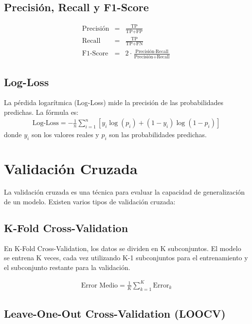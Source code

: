 \documentclass[a4paper]{report} %
\begin{document}
\subsection{Precisión, Recall y F1-Score}

\begin{eqnarray*}
\text{Precisión} &=& \frac{\text{TP}}{\text{TP} + \text{FP}} \\
\text{Recall} &=& \frac{\text{TP}}{\text{TP} + \text{FN}} \\
\text{F1-Score} &=& 2 \cdot \frac{\text{Precisión} \cdot \text{Recall}}{\text{Precisión} + \text{Recall}}
\end{eqnarray*}

\subsection{Log-Loss}

La pérdida logarítmica (Log-Loss) mide la precisión de las probabilidades predichas. La fórmula es:
\begin{eqnarray*}
\text{Log-Loss} = -\frac{1}{n} \sum_{i=1}^{n} \left[ y_i \log(p_i) + (1 - y_i) \log(1 - p_i) \right]
\end{eqnarray*}
donde $y_i$ son los valores reales y $p_i$ son las probabilidades predichas.

\section{Validación Cruzada}

La validación cruzada es una técnica para evaluar la capacidad de generalización de un modelo. Existen varios tipos de validación cruzada:

\subsection{K-Fold Cross-Validation}

En K-Fold Cross-Validation, los datos se dividen en K subconjuntos. El modelo se entrena K veces, cada vez utilizando K-1 subconjuntos para el entrenamiento y el subconjunto restante para la validación.

\begin{eqnarray*}
\text{Error Medio} = \frac{1}{K} \sum_{k=1}^{K} \text{Error}_k
\end{eqnarray*}

\subsection{Leave-One-Out Cross-Validation (LOOCV)}
\end{document}

